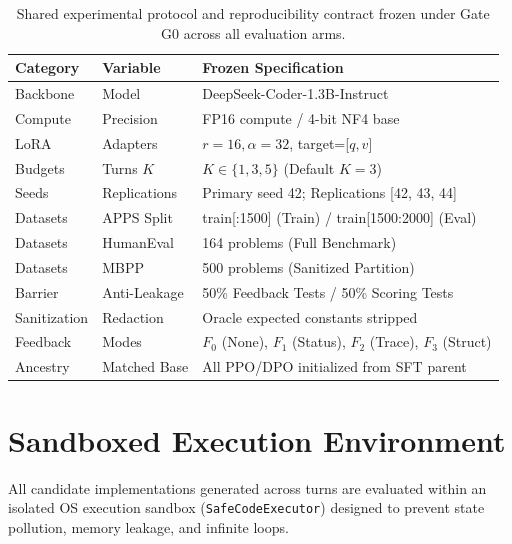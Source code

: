 \documentclass[letterpaper]{article} %
\begin{document}
\begin{table}[t]
\centering
\footnotesize
\setlength{\tabcolsep}{2.5pt}
\begin{tabular}{@{}llp{4.2cm}@{}}
\toprule
\textbf{Category} & \textbf{Variable} & \textbf{Frozen Specification} \\
\midrule
Backbone & Model & DeepSeek-Coder-1.3B-Instruct \\
Compute & Precision & FP16 compute / 4-bit NF4 base \\
LoRA & Adapters & $r=16, \alpha=32$, target=[$q, v$] \\
Budgets & Turns $K$ & $K \in \{1, 3, 5\}$ (Default $K=3$) \\
Seeds & Replications & Primary seed 42; Replications [42, 43, 44] \\
Datasets & APPS Split & train[:1500] (Train) / train[1500:2000] (Eval) \\
Datasets & HumanEval & 164 problems (Full Benchmark) \\
Datasets & MBPP & 500 problems (Sanitized Partition) \\
Barrier & Anti-Leakage & 50\% Feedback Tests / 50\% Scoring Tests \\
Sanitization & Redaction & Oracle expected constants stripped \\
Feedback & Modes & $F_0$ (None), $F_1$ (Status), $F_2$ (Trace), $F_3$ (Struct) \\
Ancestry & Matched Base & All PPO/DPO initialized from SFT parent \\
\bottomrule
\end{tabular}
\caption{Shared experimental protocol and reproducibility contract frozen under Gate G0 across all evaluation arms.}
\label{tab:protocol_contract}
\end{table}

\section{Sandboxed Execution Environment}
\label{sec:sandbox}

All candidate implementations generated across turns are evaluated within an isolated OS execution sandbox (\texttt{SafeCodeExecutor}) designed to prevent state pollution, memory leakage, and infinite loops.
\end{document}
